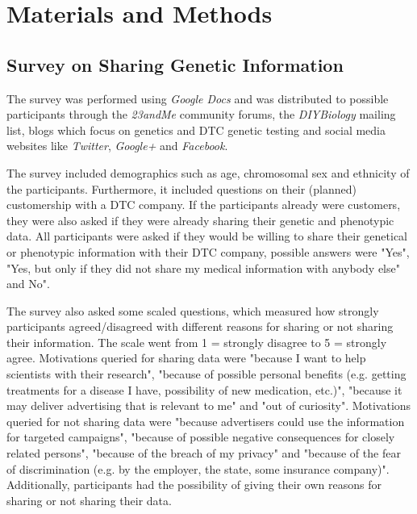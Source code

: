 \documentclass[10pt]{article}
\begin{document}
 
\section*{Materials and Methods}

\subsection*{Survey on Sharing Genetic Information}
The survey was performed using \textit{Google Docs} and was distributed to possible participants through the \textit{23andMe }community forums, the \textit{DIYBiology} mailing list, 
blogs which focus on genetics and DTC genetic testing and social media websites like \textit{Twitter}, \textit{Google+} and \textit{Facebook}.  

The survey included demographics such as age, chromosomal sex and ethnicity of the participants. Furthermore, it included questions on their 
(planned) customership with a DTC company. If the participants already were customers, they were also asked if they were already sharing their genetic and phenotypic data. 
All participants were asked if they would be willing to share their genetical or phenotypic information with their DTC company, possible answers were "Yes", "Yes, 
but only if they did not share my medical information with anybody else" and No".

The survey also asked some scaled questions, which measured how strongly participants agreed/disagreed with different reasons for sharing or not sharing their 
information. The scale went from 1 = strongly disagree to  5 = strongly agree. Motivations queried for sharing data 
were "because I want to help scientists with their research", "because of possible personal benefits (e.g. getting treatments for a disease I have, 
possibility of new medication, etc.)", "because it may deliver advertising that is relevant to me" and "out of curiosity". Motivations queried for not sharing 
data were "because advertisers could use the information for targeted campaigns", "because of possible negative consequences for closely related persons", 
"because of the breach of my privacy" and "because of the fear of discrimination (e.g. by the employer, the state, some insurance company)". 
Additionally, participants had the possibility of giving their own reasons for sharing or not sharing their data.
\end{document}
